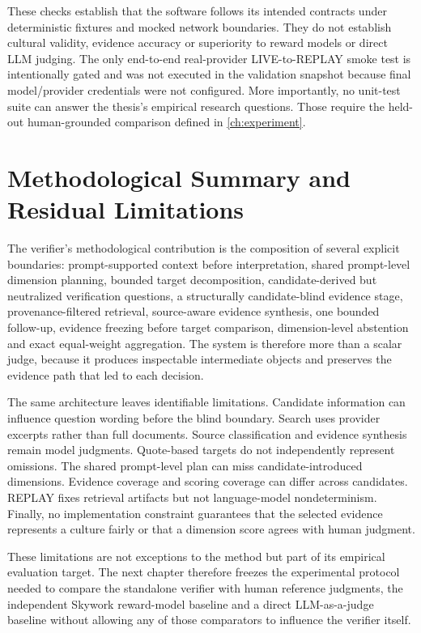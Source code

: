 These checks establish that the software follows its intended contracts under deterministic fixtures and mocked network boundaries. They do not establish cultural validity, evidence accuracy or superiority to reward models or direct LLM judging. The only end-to-end real-provider LIVE-to-REPLAY smoke test is intentionally gated and was not executed in the validation snapshot because final model/provider credentials were not configured. More importantly, no unit-test suite can answer the thesis's empirical research questions. Those require the held-out human-grounded comparison defined in \cref{ch:experiment}.

\section{Methodological Summary and Residual Limitations}
\label{sec:verifier-summary}

The verifier's methodological contribution is the composition of several explicit boundaries: prompt-supported context before interpretation, shared prompt-level dimension planning, bounded target decomposition, candidate-derived but neutralized verification questions, a structurally candidate-blind evidence stage, provenance-filtered retrieval, source-aware evidence synthesis, one bounded follow-up, evidence freezing before target comparison, dimension-level abstention and exact equal-weight aggregation. The system is therefore more than a scalar judge, because it produces inspectable intermediate objects and preserves the evidence path that led to each decision.

The same architecture leaves identifiable limitations. Candidate information can influence question wording before the blind boundary. Search uses provider excerpts rather than full documents. Source classification and evidence synthesis remain model judgments. Quote-based targets do not independently represent omissions. The shared prompt-level plan can miss candidate-introduced dimensions. Evidence coverage and scoring coverage can differ across candidates. REPLAY fixes retrieval artifacts but not language-model nondeterminism. Finally, no implementation constraint guarantees that the selected evidence represents a culture fairly or that a dimension score agrees with human judgment.

These limitations are not exceptions to the method but part of its empirical evaluation target. The next chapter therefore freezes the experimental protocol needed to compare the standalone verifier with human reference judgments, the independent Skywork reward-model baseline and a direct LLM-as-a-judge baseline without allowing any of those comparators to influence the verifier itself.

